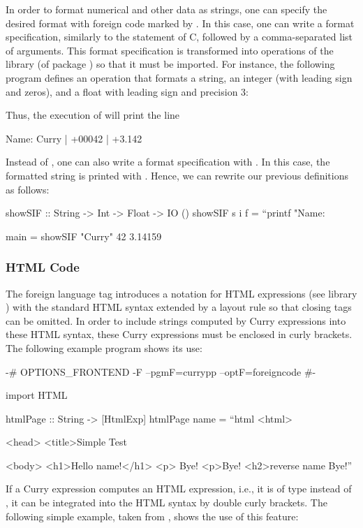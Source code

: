 In order to format numerical and other data as strings,
one can specify the desired format with foreign code marked by
. In this case, one can write a format specification,
similarly to the  statement of C,
followed by a comma-separated list of arguments.
This format specification is transformed into operations
of the library  (of package )
so that it must be imported.
For instance, the following program defines an operation
that formats a string, an integer (with leading sign and zeros),
and a float with leading sign and precision 3:
Thus, the execution of  will print the line
\begin{curry}
Name: Curry | +00042 | +3.142
\end{curry}

Instead of , one can also write a format specification
with . In this case, the formatted string is
printed with . Hence, we can rewrite our previous definitions
as follows:
\begin{curry}
showSIF :: String -> Int -> Float -> IO ()
showSIF s i f = ``printf "Name: %

main = showSIF "Curry" 42 3.14159
\end{curry}


\subsubsection{HTML Code}

The foreign language tag  introduces a notation
for HTML expressions (see \CYS library )
with the standard HTML syntax extended by a layout rule
so that closing tags can be omitted.
In order to include strings computed by Curry expressions
into these HTML syntax, these Curry expressions must be enclosed
in curly brackets.
The following example program shows its use:
\begin{curry}
{-# OPTIONS_FRONTEND -F --pgmF=currypp --optF=foreigncode #-}

import HTML

htmlPage :: String -> [HtmlExp]
htmlPage name = ``html
 <html>

  <head>
   <title>Simple Test

  <body>
   <h1>Hello {name}!</h1>
    <p>
     Bye!
    <p>Bye!
   <h2>{reverse name}
   Bye!''
\end{curry}
%
If a Curry expression computes an HTML expression,
i.e., it is of type  instead of ,
it can be integrated into the HTML syntax by double curly brackets.
The following simple example, taken from \cite{Hanus01PADL},
shows the use of this feature:

